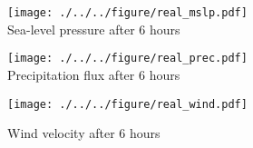 \begin{figure}[tbh]
\begin{center}
  \texttt{[image: ./../../figure/real\_mslp.pdf]}\\
  \caption{Sea-level pressure after 6 hours}
  \label{fig:real_mslp}
\end{center}
\begin{center}
  \texttt{[image: ./../../figure/real\_prec.pdf]}\\
  \caption{Precipitation flux after 6 hours}
  \label{fig:real_prec}
\end{center}
\begin{center}
  \texttt{[image: ./../../figure/real\_wind.pdf]}\\
  \caption{Wind velocity after 6 hours}
  \label{fig:real_wind}
\end{center}
\end{figure}

